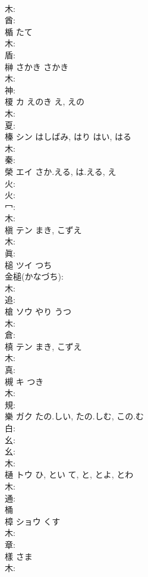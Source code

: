 \documentclass[8pt]{extreport}
\begin{document}
\begin{CJK}{UTF8}{min}
\\	木: 
\\	酋: 
\\	楯		たて				
\\	木: 
\\	盾: 
\\	榊	さかき	さかき		
\\	木: 
\\	神: 
\\	榎	カ	えのき	え, えの	
\\	木: 
\\	夏: 
\\	榛	シン	はしばみ, はり	はい, はる	
\\	木: 
\\	秦: 
\\	榮	エイ	さか.える, は.える, え		
\\	火: 
\\	火: 
\\	冖: 
\\	木: 
\\	槇	テン	まき, こずえ		
\\	木: 
\\	眞: 
\\	槌	ツイ	つち		
\\	金槌(かなづち): 
\\	木: 
\\	追: 
\\	槍	ソウ	やり	うつ	
\\	木: 
\\	倉: 
\\	槙	テン	まき, こずえ		
\\	木: 
\\	真: 
\\	槻	キ	つき		
\\	木: 
\\	規: 
\\	樂	ガク	たの.しい, たの.しむ, この.む		
\\	白: 
\\	幺: 
\\	幺: 
\\	木: 
\\	樋	トウ	ひ, とい	て, と, とよ, とわ	
\\	木: 
\\	通: 
\\	桶 
\\	樟	ショウ	くす		
\\	木: 
\\	章: 
\\	樣		さま				
\\	木: 

\end{CJK}
\end{document}
